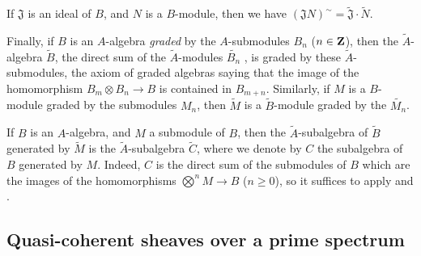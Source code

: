 \begin{env}[1.3.13]
If $\mathfrak{J}$ is an ideal of $B$, and $N$ is a $B$-module, then we have $(\mathfrak{J}N)^\sim=\widetilde{\mathfrak{J}}\cdot\widetilde{N}$.

Finally, if $B$ is an $A$-algebra \emph{graded} by the $A$-submodules $B_n$ ($n\in\mathbf{Z}$), then the $\widetilde{A}$-algebra $\widetilde{B}$, the direct sum of the $\widetilde{A}$-modules $\widetilde{B_n}$ , is graded by these $\widetilde{A}$-submodules, the axiom of graded algebras saying that the image of the homomorphism $B_m\otimes B_n\to B$ is contained in $B_{m+n}$.
Similarly, if $M$ is a $B$-module graded by the submodules $M_n$, then $\widetilde{M}$ is a $\widetilde{B}$-module graded by the $\widetilde{M_n}$.
\end{env}

\begin{env}[1.3.14]
\label{I.1.3.14}
If $B$ is an $A$-algebra, and $M$ a submodule of $B$, then the $\widetilde{A}$-subalgebra of $\widetilde{B}$ generated by $\widetilde{M}$  is the $\widetilde{A}$-subalgebra $\widetilde{C}$, where we denote by $C$ the subalgebra of $B$ generated by $M$.
Indeed, $C$ is the direct sum of the submodules of $B$ which are the images of the homomorphisms $\bigotimes^n M\to B$ ($n\geq 0$), so it suffices to apply  and .
\end{env}

\subsection{Quasi-coherent sheaves over a prime spectrum}
\label{subsection:I.1.4}

